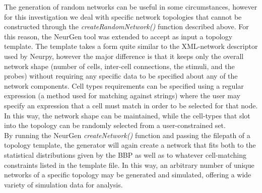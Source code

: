 \documentclass[letterpaper, 10 pt, conference]{ieeeconf}  %
\begin{document}
The generation of random networks can be useful in some circumstances, however for this investigation we deal with specific network topologies that cannot be constructed through the \emph{createRandomNetwork()} function described above. For this reason, the NeurGen tool was extended to accept as input a topology template. The template takes a form quite similar to the XML-network descriptor used by Neurpy, however the major difference is that it keeps only the overall network shape (number of cells, inter-cell connections, the stimuli, and the probes) without requiring any specific data to be specified about any of the network components. Cell types requirements can be specified using a regular expression (a method used for matching against strings) where the user may specify an expression that a cell must match in order to be selected for that node. In this way, the network shape can be maintained, while the cell-types that slot into the topology can be randomly selected from a user-constrained set.\\
By running the NeurGen \emph{createNetwork()} function and passing the filepath of a topology template, the generator will again create a network that fits both to the statistical distributions given by the BBP as well as to whatever cell-matching constraints listed in the template file. In this way, an arbitrary number of unique networks of a specific topology may be generated and simulated, offering a wide variety of simulation data for analysis.
\end{document}
